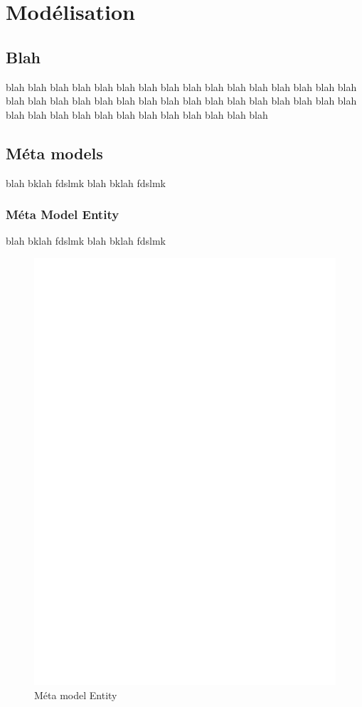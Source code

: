 \chapter{Modélisation}\label{chap:mod}
\section{Blah}
blah blah blah blah blah blah blah blah blah blah blah blah blah blah blah blah blah blah 
blah blah blah blah blah blah blah blah blah blah blah blah blah blah blah blah blah blah blah blah blah blah blah blah blah blah 
\section{Méta models}\label{sec:met}
blah bklah fdslmk blah bklah fdslmk 

\subsection{Méta Model Entity}\label{sub:ent}
blah bklah fdslmk blah bklah fdslmk 
\begin{figure}[htb]
  \centering
  \includegraphics[scale=.3]{img/Entity.eps}
  \caption{Méta model Entity}
  \label{fig:ent}
\end{figure}

